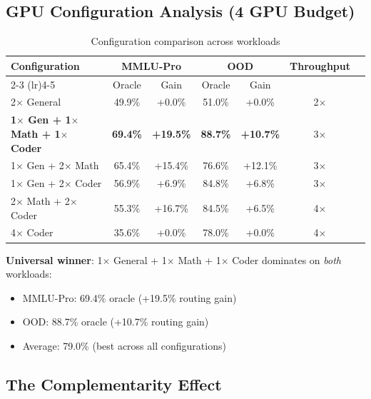 \documentclass[11pt,a4paper]{article}
\begin{document}
\subsection{GPU Configuration Analysis (4 GPU Budget)}

\begin{table}[h]
\centering
\caption{Configuration comparison across workloads}
\label{tab:configs}
\begin{tabular}{lcccccc}
\toprule
\multirow{2}{*}{\textbf{Configuration}} & \multicolumn{2}{c}{\textbf{MMLU-Pro}} & \multicolumn{2}{c}{\textbf{OOD}} & \multirow{2}{*}{\textbf{Throughput}} \\
\cmidrule(lr){2-3} \cmidrule(lr){4-5}
& Oracle & Gain & Oracle & Gain & \\
\midrule
2$\times$ General & 49.9\% & +0.0\% & 51.0\% & +0.0\% & 2$\times$ \\
\textbf{1$\times$ Gen + 1$\times$ Math + 1$\times$ Coder} & \textbf{69.4\%} & \textbf{+19.5\%} & \textbf{88.7\%} & \textbf{+10.7\%} & 3$\times$ \\
1$\times$ Gen + 2$\times$ Math & 65.4\% & +15.4\% & 76.6\% & +12.1\% & 3$\times$ \\
1$\times$ Gen + 2$\times$ Coder & 56.9\% & +6.9\% & 84.8\% & +6.8\% & 3$\times$ \\
2$\times$ Math + 2$\times$ Coder & 55.3\% & +16.7\% & 84.5\% & +6.5\% & 4$\times$ \\
4$\times$ Coder & 35.6\% & +0.0\% & 78.0\% & +0.0\% & 4$\times$ \\
\bottomrule
\end{tabular}
\end{table}

\textbf{Universal winner}: 1$\times$ General + 1$\times$ Math + 1$\times$ Coder dominates on \emph{both} workloads:
\begin{itemize}
    \item MMLU-Pro: 69.4\% oracle (+19.5\% routing gain)
    \item OOD: 88.7\% oracle (+10.7\% routing gain)
    \item Average: 79.0\% (best across all configurations)
\end{itemize}

\subsection{The Complementarity Effect}
\end{document}

